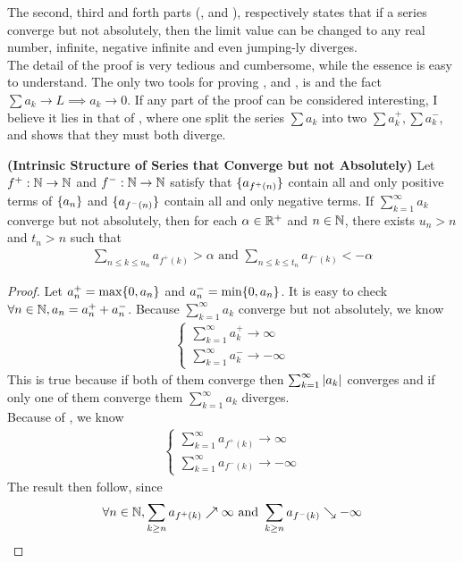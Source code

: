 \documentclass{report}
\begin{document}
\begin{mdframed}
The second, third and forth parts (,  and ), respectively states that if a series converge but not absolutely, then the limit value can be changed to any real number, infinite, negative infinite and even jumping-ly diverges.\\

The detail of the proof is very tedious and cumbersome, while the essence is easy to understand. The only two tools for proving ,  and , is  and the fact $\sum a_k\to L \implies a_k\to 0$. If any part of the proof can be considered interesting, I believe it lies in that of , where one split the series $\sum a_k$ into two $\sum a_k^+,\sum a_k^-$, and shows that they must both diverge. 
\end{mdframed}
\begin{lemma}
\label{l1}
\textbf{(Intrinsic Structure of Series that Converge but not Absolutely)} Let $f^+:\mathbb{N}\rightarrow \mathbb{N}$ and $f^-:\mathbb{N}\rightarrow \mathbb{N}$ satisfy that $\{ a_{f^+(n)} \}$ contain all and only positive terms of $\{ a_n \}$ and $\{ a_{f^-(n)} \}$ contain all and only negative terms. If $\sum_{k=1}^\infty a_k$ converge but not absolutely, then for each $\alpha \in\mathbb{R}^+$ and $n\in\mathbb{N}$, there exists  $u_n>n$ and $t_n>n$ such that 
\begin{align*}
\sum_{n\leq k\leq u_n} a_{f^+(k)}>\alpha \text{ and }\sum_{n\leq k\leq t_n}a_{f^-(k)}<-\alpha 
\end{align*}
\end{lemma}
\begin{proof}
Let $a_n^+=\max \{ 0,a_n \}$ and $a_n^-=\min \{ 0,a_n \}$. It is easy to check $\forall n\in\mathbb{N}, a_n=a_n^++a_n^-$. Because $\sum_{k=1}^\infty a_k$ converge but not absolutely, we know 
\begin{align}
\label{e9}
\begin{cases}
  \sum_{k=1}^\infty a_k^+\to\infty\\
  \sum_{k=1}^\infty a_k^-\to-\infty
\end{cases}
\end{align}
This is true because if both of them converge then $\sum_{k=1}^\infty \left|a_k\right|$ converges and if only one of them converge them $\sum_{k=1}^\infty a_k$ diverges.\\


Because of  , we know 
\begin{align*}
\begin{cases}
  \sum_{k=1}^\infty a_{f^+(k)}\to \infty\\
  \sum_{k=1}^\infty a_{f^-(k)}\to -\infty
\end{cases}
\end{align*}
The result then follow, since 
\begin{align*}
\forall n\in\mathbb{N}, \sum_{k\geq n}a_{f^+(k)}\nearrow \infty \text{ and }\sum_{k\geq n}a_{f^-(k)}\searrow -\infty
\end{align*}
\end{proof}
\end{document}
